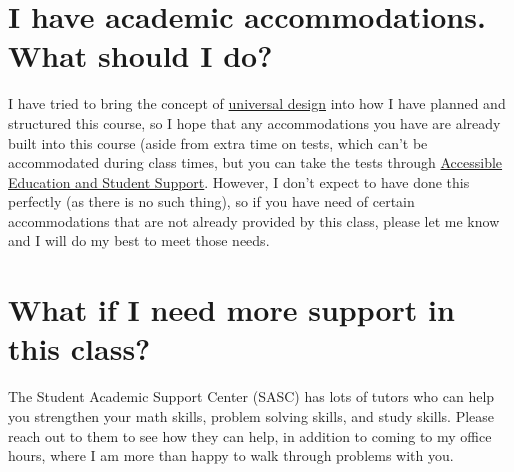 \documentclass[
  letterpaper,
  DIV=11,
  numbers=noendperiod]{scrartcl}
\begin{document}
\section{I have academic accommodations. What should I
do?}\label{accommodations}

I have tried to bring the concept of
\href{https://www.washington.edu/doit/what-universal-design-0}{universal
design} into how I have planned and structured this course, so I hope
that any accommodations you have are already built into this course
(aside from extra time on tests, which can't be accommodated during
class times, but you can take the tests through
\href{https://www.bates.edu/accessible-education-student-support/requesting-services/how-to-register-for-accommodations/}{Accessible
Education and Student Support}. However, I don't expect to have done
this perfectly (as there is no such thing), so if you have need of
certain accommodations that are not already provided by this class,
please let me know and I will do my best to meet those needs.

\section{What if I need more support in this class?}\label{extrahelp}

The Student Academic Support Center (SASC) has lots of tutors who can
help you strengthen your math skills, problem solving skills, and study
skills. Please reach out to them to see how they can help, in addition
to coming to my office hours, where I am more than happy to walk through
problems with you.
\end{document}
